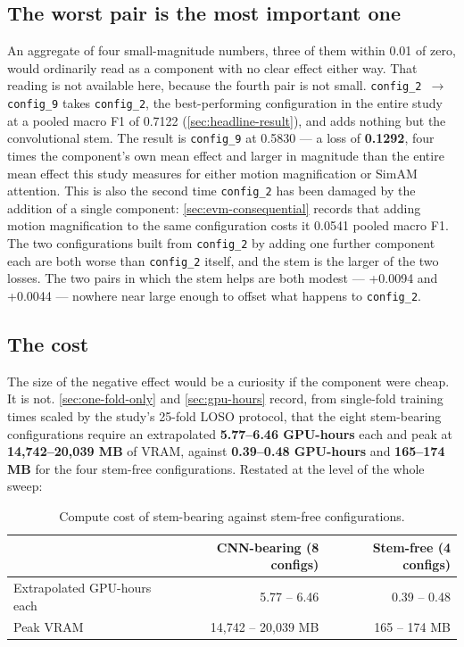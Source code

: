 \subsection{The worst pair is the most important one}
\label{sec:cnn-worst-pair}

An aggregate of four small-magnitude numbers, three of them within 0.01 of zero, would ordinarily read as a component with no clear effect either way. That reading is not available here, because the fourth pair is not small. \texttt{config\_2 $\rightarrow$ config\_9} takes \texttt{config\_2}, the best-performing configuration in the entire study at a pooled macro F1 of 0.7122 (\autoref{sec:headline-result}), and adds nothing but the convolutional stem. The result is \texttt{config\_9} at 0.5830 --- a loss of \textbf{0.1292}, four times the component's own mean effect and larger in magnitude than the entire mean effect this study measures for either motion magnification or SimAM attention. This is also the second time \texttt{config\_2} has been damaged by the addition of a single component: \autoref{sec:evm-consequential} records that adding motion magnification to the same configuration costs it 0.0541 pooled macro F1. The two configurations built from \texttt{config\_2} by adding one further component each are both worse than \texttt{config\_2} itself, and the stem is the larger of the two losses. The two pairs in which the stem helps are both modest --- +0.0094 and +0.0044 --- nowhere near large enough to offset what happens to \texttt{config\_2}.

\subsection{The cost}
\label{sec:cnn-cost}

The size of the negative effect would be a curiosity if the component were cheap. It is not. \autoref{sec:one-fold-only} and \autoref{sec:gpu-hours} record, from single-fold training times scaled by the study's 25-fold LOSO protocol, that the eight stem-bearing configurations require an extrapolated \textbf{5.77--6.46 GPU-hours} each and peak at \textbf{14,742--20,039 MB} of VRAM, against \textbf{0.39--0.48 GPU-hours} and \textbf{165--174 MB} for the four stem-free configurations. Restated at the level of the whole sweep:

\begin{table}[htbp]
	\centering
	\begin{tabular}{l r r}
		\hline
		 & \textbf{CNN-bearing (8 configs)} & \textbf{Stem-free (4 configs)} \\
		\hline
		Extrapolated GPU-hours each & 5.77 -- 6.46 & 0.39 -- 0.48 \\
		Peak VRAM & 14,742 -- 20,039 MB & 165 -- 174 MB \\
		\hline
	\end{tabular}
	\caption[Compute cost of stem-bearing against stem-free configurations]{Compute cost of stem-bearing against stem-free configurations.}
	\label{tab:cnn-cost}
\end{table}

